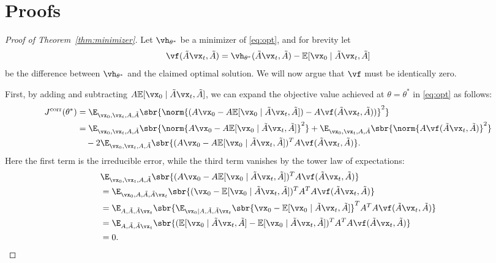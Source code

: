 \documentclass{article}
\begin{document}
\printbibliography
\newpage
\appendix


\section{Proofs}

\begin{proof}[Proof of Theorem~\ref{thm:minimizer}]
    Let $\vh_{\theta^*}$ be a minimizer of \eqref{eq:opt}, and for brevity let \[ \vf(\tilde{A} \vx_t, \tilde{A}) = \vh_{\theta^*}( \tilde{A}\vx_t, \tilde{A} ) - \mathbb{E}[ \vx_0 \mid \tilde{A}\vx_t, \tilde{A}] \] be the difference between $\vh_{\theta^*}$ and the claimed optimal solution. We will now argue that $\vf$ must be identically zero.
    
    First, by adding and subtracting $A\mathbb{E}[ \vx_0 \mid \tilde{A}\vx_t, \tilde{A}]$, we can expand the objective value achieved at $\theta = \theta^*$ in \eqref{eq:opt} as follows: \begin{align*}
        J^{\mathrm{corr}}(\theta^*) &= \E_{\vx_0, \vx_t, A, \tilde{A}} \sbr{ \norm{ (A\vx_0 - A\mathbb{E}[ \vx_0 \mid \tilde{A}\vx_t, \tilde{A}]) - A\vf(\tilde{A} \vx_t, \tilde{A})) }^2 } \\
        &= \E_{\vx_0, \vx_t, A, \tilde{A}} \sbr{ \norm{ A\vx_0 - A\mathbb{E}[ \vx_0 \mid \tilde{A}\vx_t, \tilde{A}]}^2 } + \E_{\vx_0, \vx_t, A, \tilde{A}} \sbr{ \norm{ A\vf(\tilde{A} \vx_t, \tilde{A}) }^2 } \\ &\quad - 2 \E_{\vx_0, \vx_t, A, \tilde{A}} \sbr{ (A\vx_0 - A\mathbb{E}[ \vx_0 \mid \tilde{A}\vx_t, \tilde{A}])^T A\vf(\tilde{A} \vx_t, \tilde{A}) }.
    \end{align*} Here the first term is the irreducible error, while the third term vanishes by the tower law of expectations: \begin{align*}
        &\E_{\vx_0, \vx_t, A, \tilde{A}} \sbr{ (A\vx_0 - A\mathbb{E}[ \vx_0 \mid \tilde{A}\vx_t, \tilde{A}])^T A\vf(\tilde{A} \vx_t, \tilde{A}) } \\
        & = \E_{\vx_0, A, \tilde{A}, \tilde{A}\vx_t} \sbr{ (\vx_0 - \mathbb{E}[ \vx_0 \mid \tilde{A}\vx_t, \tilde{A}])^T A^T A\vf(\tilde{A} \vx_t, \tilde{A}) } \\
        & = \E_{A, \tilde{A}, \tilde{A}\vx_t} \sbr{ \E_{\vx_0|A, \tilde{A}, \tilde{A}\vx_t} \sbr{ \vx_0 - \mathbb{E}[ \vx_0 \mid \tilde{A}\vx_t, \tilde{A}]}^T A^TA\vf(\tilde{A} \vx_t, \tilde{A}) } \\
        & = \E_{A, \tilde{A}, \tilde{A}\vx_t} \sbr{ ( \mathbb{E}[ \vx_0 \mid \tilde{A}\vx_t, \tilde{A}] - \mathbb{E}[ \vx_0 \mid \tilde{A}\vx_t, \tilde{A}])^T A^TA\vf(\tilde{A} \vx_t, \tilde{A}) } \\
        & = 0.
    \end{align*}
    

\end{proof}
\end{document}
